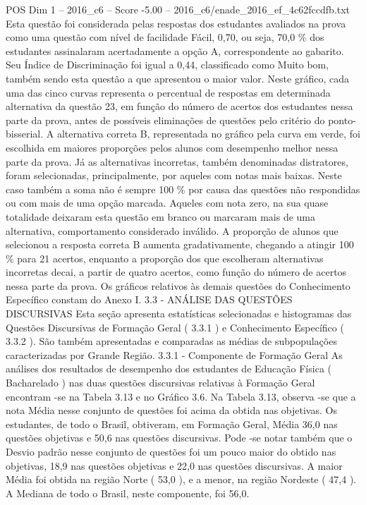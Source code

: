 \begin{textsample}{POS Dim 1 – 2016\_c6 – Score -5.00 – 2016\_c6/enade\_2016\_ef\_4c62fccdfb.txt}
Esta questão foi considerada pelas respostas dos estudantes avaliados na prova como uma questão com nível de facilidade Fácil, 0,70, ou seja, 70,0 \% dos estudantes assinalaram acertadamente a opção A, correspondente ao gabarito.
Seu Índice de Discriminação foi igual a 0,44, classificado como Muito bom, também sendo esta questão a que apresentou o maior valor.
Neste gráfico, cada uma das cinco curvas representa o percentual de respostas em determinada alternativa da questão 23, em função do número de acertos dos estudantes nessa parte da prova, antes de possíveis eliminações de questões pelo critério do ponto-bisserial.
A alternativa correta B, representada no gráfico pela curva em verde, foi escolhida em maiores proporções pelos alunos com desempenho melhor nessa parte da prova.
Já as alternativas incorretas, também denominadas distratores, foram selecionadas, principalmente, por aqueles com notas mais baixas.
Neste caso também a soma não é sempre 100 \% por causa das questões não respondidas ou com mais de uma opção marcada.
Aqueles com nota zero, na sua quase totalidade deixaram esta questão em branco ou marcaram mais de uma alternativa, comportamento considerado inválido.
A proporção de alunos que selecionou a resposta correta B aumenta gradativamente, chegando a atingir 100 \% para 21 acertos, enquanto a proporção dos que escolheram alternativas incorretas decai, a partir de quatro acertos, como função do número de acertos nessa parte da prova.
Os gráficos relativos às demais questões do Conhecimento Específico constam do Anexo I. 3.3 - ANÁLISE DAS QUESTÕES DISCURSIVAS Esta seção apresenta estatísticas selecionadas e histogramas das Questões Discursivas de Formação Geral ( 3.3.1 ) e Conhecimento Específico ( 3.3.2 ).
São também apresentadas e comparadas as médias de subpopulações caracterizadas por Grande Região. 3.3.1 - Componente de Formação Geral As análises dos resultados de desempenho dos estudantes de Educação Física ( Bacharelado ) nas duas questões discursivas relativas à Formação Geral encontram -se na Tabela 3.13 e no Gráfico 3.6.
Na Tabela 3.13, observa -se que a nota Média nesse conjunto de questões foi acima da obtida nas objetivas.
Os estudantes, de todo o Brasil, obtiveram, em Formação Geral, Média 36,0 nas questões objetivas e 50,6 nas questões discursivas.
Pode -se notar também que o Desvio padrão nesse conjunto de questões foi um pouco maior do obtido nas objetivas, 18,9 nas questões objetivas e 22,0 nas questões discursivas.
A maior Média foi obtida na região Norte ( 53,0 ), e a menor, na região Nordeste ( 47,4 ).
A Mediana de todo o Brasil, neste componente, foi 56,0.

\end{textsample}

